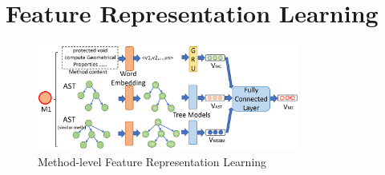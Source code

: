 \section{Feature Representation Learning}
\label{feature-learning:sec}

\begin{figure}[t]
	\centering
	\includegraphics[width=3.4in]{graphs/step-2-method.png}
	\caption{Method-level Feature Representation Learning}
	\label{method-level-feature-learning}
\end{figure}
